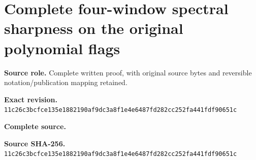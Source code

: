 \begingroup
\sloppy
\small
\section{Complete four-window spectral sharpness on the original polynomial flags}
\noindent\textbf{Source role.} Complete written proof, with original source bytes and reversible notation/publication mapping retained.\par
\noindent\textbf{Exact revision.} \nolinkurl{11c26c3bcfce135e1882190af9dc3a8f1e4e6487fd282cc252fa441fdf90651c}\par
\noindent\textbf{Complete source.} \par
\noindent\textbf{Source SHA-256.} \nolinkurl{11c26c3bcfce135e1882190af9dc3a8f1e4e6487fd282cc252fa441fdf90651c}\par\medskip

\endgroup
